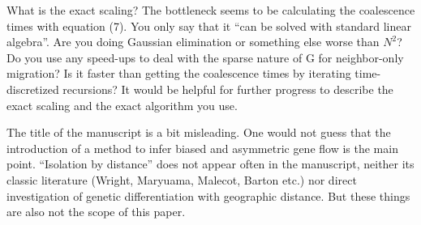 
\begin{point}{}
    What is the exact scaling? The bottleneck seems to be calculating the
    coalescence times with equation (7). You only say that it ``can be solved
    with standard linear algebra''. Are you doing Gaussian elimination or
    something else worse than $N^2$? Do you use any speed-ups to
    deal with the sparse nature of G for neighbor-only migration? Is it faster
    than getting the coalescence times by iterating time-discretized
    recursions?  It would be helpful for further progress to describe the exact
    scaling and the exact algorithm you use.
\end{point}


\begin{point}{}
    The title of the manuscript is a bit misleading. One would not guess that
    the introduction of a method to infer biased and asymmetric gene flow is the
    main point.  ``Isolation by distance'' does not appear often in the manuscript,
    neither its classic literature (Wright, Maryuama, Malecot, Barton etc.) nor
    direct investigation of genetic differentiation with geographic distance. But
    these things are also not the scope of this paper.  
\end{point}


